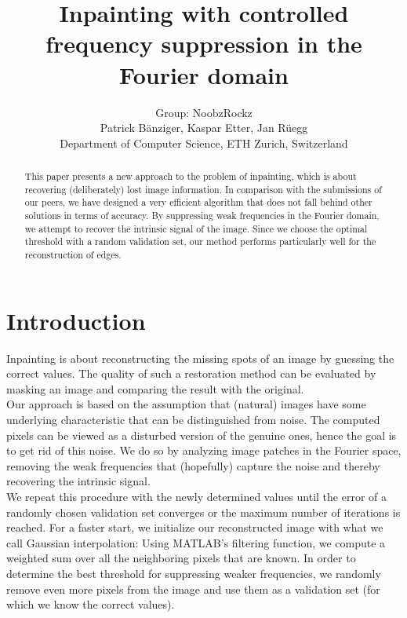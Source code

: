 \documentclass[10pt,conference,compsocconf]{IEEEtran}
\begin{document}
\title{Inpainting with controlled frequency suppression in the Fourier domain}

\author{
  Group: NoobzRockz\\
  Patrick Bänziger, Kaspar Etter, Jan Rüegg\\
  Department of Computer Science, ETH Zurich, Switzerland
}

\maketitle

\begin{abstract}
This paper presents a new approach to the problem of inpainting, which is about recovering (deliberately) lost image information. In comparison with the submissions of our peers, we have designed a very efficient algorithm that does not fall behind other solutions in terms of accuracy. By suppressing weak frequencies in the Fourier domain, we attempt to recover the intrinsic signal of the image. Since we choose the optimal threshold with a random validation set, our method performs particularly well for the reconstruction of edges.
\end{abstract}

\section{Introduction}
Inpainting is about reconstructing the missing spots of an image by guessing the correct values. The quality of such a restoration method can be evaluated by masking an image and comparing the result with the original.\\
Our approach is based on the assumption that (natural) images have some underlying characteristic that can be distinguished from noise. The computed pixels can be viewed as a disturbed version of the genuine ones, hence the goal is to get rid of this noise. We do so by analyzing image patches in the Fourier space, removing the weak frequencies that (hopefully) capture the noise and thereby recovering the intrinsic signal.\\
We repeat this procedure with the newly determined values until the error of a randomly chosen validation set converges or the maximum number of iterations is reached. For a faster start, we initialize our reconstructed image with what we call Gaussian interpolation: Using MATLAB's filtering function, we compute a weighted sum over all the neighboring pixels that are known. In order to determine the best threshold for suppressing weaker frequencies, we randomly remove even more pixels from the image and use them as a validation set (for which we know the correct values).
\end{document}
